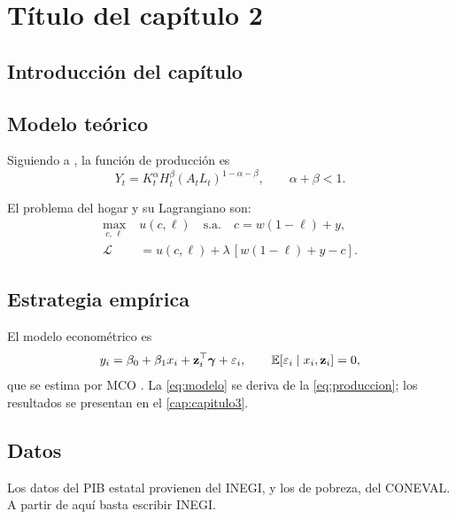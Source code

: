 \chapter{Título del capítulo 2}\label{cap:capitulo2}

\section{Introducción del capítulo}

\lipsum[9]

\section{Modelo teórico}

Siguiendo a \textcite{mankiw1992}, la función de producción es
\begin{equation}
  Y_t = K_t^{\alpha} H_t^{\beta} (A_t L_t)^{1-\alpha-\beta},
  \qquad \alpha + \beta < 1. \label{eq:produccion}
\end{equation}

El problema del hogar y su Lagrangiano son:
\begin{align}
  \max_{c,\,\ell} \; & u(c, \ell) \quad \text{s.a.} \quad c = w(1-\ell) + y, \label{eq:problema}\\
  \mathcal{L} &= u(c,\ell) + \lambda\,[w(1-\ell) + y - c]. \label{eq:lagrangiano}
\end{align}

\section{Estrategia empírica}

El modelo econométrico es
\begin{equation}
  y_i = \beta_0 + \beta_1 x_i + \mathbf{z}_i^{\top}\boldsymbol{\gamma}
        + \varepsilon_i, \qquad \mathbb{E}[\varepsilon_i \mid x_i, \mathbf{z}_i] = 0,
  \label{eq:modelo}
\end{equation}
que se estima por \ac{MCO}
\parencite{wooldridge2010, angrist2009}. La \cref{eq:modelo} se deriva de la
\cref{eq:produccion}; los resultados se presentan en el \cref{cap:capitulo3}.

\section{Datos}

Los datos del \ac{PIB} estatal provienen del \ac{INEGI}, y los de pobreza,
del \ac{CONEVAL}. A partir de aquí basta escribir \ac{INEGI}. \lipsum[10]
